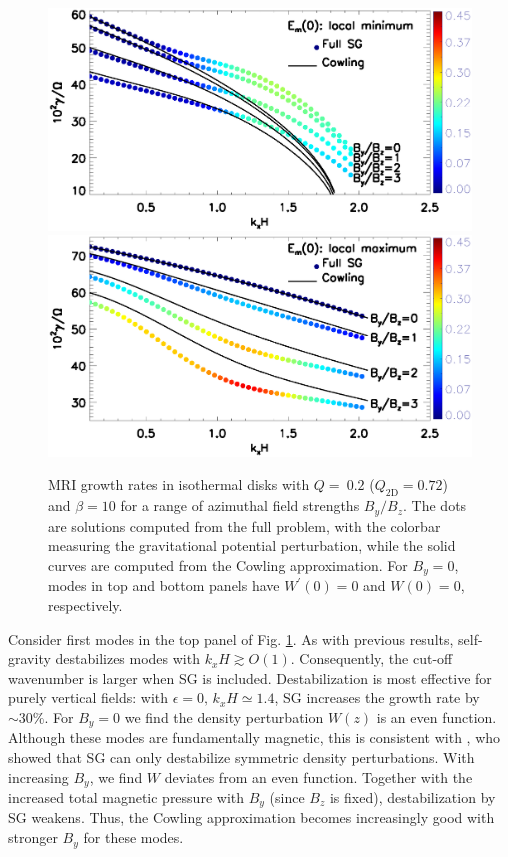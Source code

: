\begin{figure}
  \includegraphics[width=\linewidth,clip=true,trim=0cm 2cm 0cm
    0cm]{figures/compare_growth3_tilted_even.ps}  
  \includegraphics[width=\linewidth,clip=true,trim=0cm 0cm 0cm
    0.52cm]{figures/compare_growth3_tilted_odd.ps} 
  \caption{MRI growth rates in isothermal disks with $Q=~0.2$ ($Q_\mathrm{2D}=0.72$) and 
    $\beta=10$ for a range of azimuthal field strengths $B_y/B_z$. The
    dots are solutions computed from the full problem, with the
    colorbar measuring the gravitational potential perturbation, while
    the solid curves are computed from the Cowling approximation. 
    For $B_y=0$, modes in top and bottom panels have
    $W^\prime(0)=0$ and $W(0)=0$, respectively.
    \label{compare_growth3_tilted}}
\end{figure}


Consider first modes in the top panel of 
Fig. \ref{compare_growth3_tilted}. As with previous results,  
self-gravity destabilizes modes with  $k_xH\gtrsim O(1)$. Consequently, the
cut-off wavenumber is larger when SG is included. 
Destabilization is most effective for purely vertical fields: with
$\epsilon=0,\, k_xH\simeq 1.4$, SG increases the growth rate by $\sim
30\%$. For $B_y=0$ we find the density perturbation $W(z)$ is an even
function. Although these modes are fundamentally magnetic, this is consistent with
\cite{goldreich65a}, who showed that SG can only destabilize 
symmetric density perturbations.  
With increasing $B_y$, we find $W$ deviates from an even
function. 
Together with the increased total magnetic pressure with 
$B_y$ (since $B_z$ is fixed), destabilization by SG weakens. 
Thus, the Cowling approximation becomes increasingly good with stronger
$B_y$ for these modes. 


